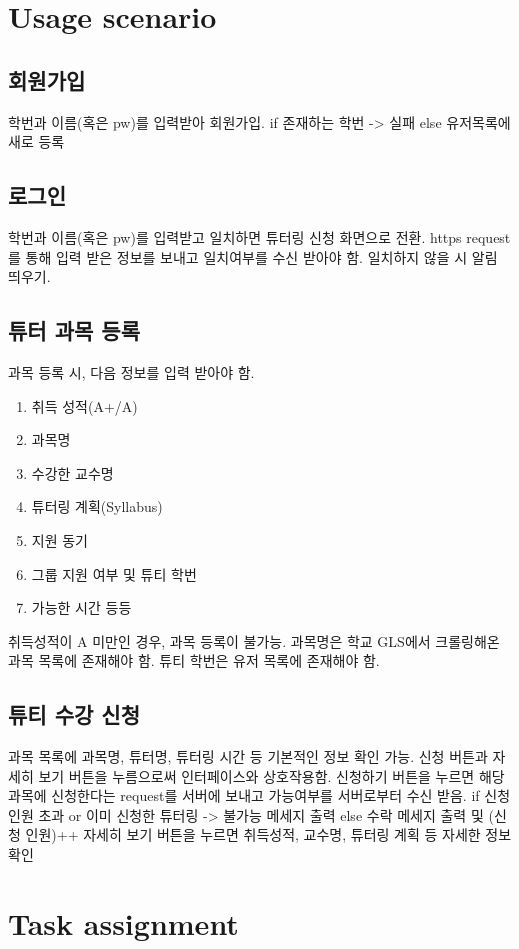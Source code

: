 \documentclass{lxaiproposal}
\begin{document}
\section{Usage scenario}
\vspace*{-3mm}
\subsection{회원가입}
학번과 이름(혹은 pw)를 입력받아 회원가입.
if 존재하는 학번 -> 실패
else 유저목록에 새로 등록

\subsection{로그인}
학번과 이름(혹은 pw)를 입력받고 일치하면 튜터링 신청 화면으로 전환.
https request를 통해 입력 받은 정보를 보내고 일치여부를 수신 받아야 함. 일치하지 않을 시 알림 띄우기.

\subsection{튜터 과목 등록}
과목 등록 시, 다음 정보를 입력 받아야 함.
\begin{enumerate}
    \item 취득 성적(A+/A)
    \item 과목명
    \item 수강한 교수명
    \item 튜터링 계획(Syllabus)
    \item 지원 동기
    \item 그룹 지원 여부 및 튜티 학번
    \item 가능한 시간 등등
\end{enumerate}
취득성적이 A 미만인 경우, 과목 등록이 불가능.
과목명은 학교 GLS에서 크롤링해온 과목 목록에 존재해야 함.
튜티 학번은 유저 목록에 존재해야 함.

\subsection{튜티 수강 신청}
과목 목록에 과목명, 튜터명, 튜터링 시간 등 기본적인 정보 확인 가능.
신청 버튼과 자세히 보기 버튼을 누름으로써 인터페이스와 상호작용함.
신청하기 버튼을 누르면 해당과목에 신청한다는 request를 서버에 보내고 가능여부를 서버로부터 수신 받음.
if 신청 인원 초과 or 이미 신청한 튜터링 -> 불가능 메세지 출력
else 수락 메세지 출력 및 (신청 인원)++
자세히 보기 버튼을 누르면 취득성적, 교수명, 튜터링 계획 등 자세한 정보 확인

\section{Task assignment}
\vspace*{-3mm}
\end{document}
